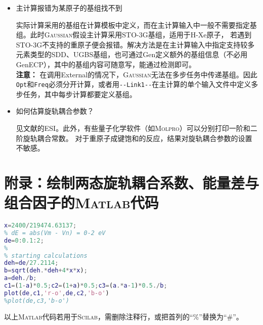 \documentclass[UTF8]{ctexart}
\begin{document}
\begin{itemize}
\item 主计算报错为某原子的基组找不到

  实际计算采用的基组在计算模板中定义，而在主计算输入中一般不需要指定基组。此时\textsc{Gaussian}假设主计算采用STO-3G基组，适用于H-Xe原子，
  若遇到STO-3G不支持的重原子便会报错。解决方法是在主计算输入中指定支持较多元素类型的\textsf{SDD}、\textsf{UGBS}基组，也可通过\textsf{Gen}定义额外的基组信息（不必用\textsf{GenECP}），其中的基组内容可随意写，能通过检测即可。\\
  \textbf{注意：} 在调用\textsf{External}的情况下，\textsc{Gaussian}无法在多步任务中传递基组。因此\verb|Opt|和\verb|Freq|必须分开计算，或者用\verb|--Link1--|在主计算的单个输入文件中定义多步任务，其中每步计算都要定义基组。

\item 如何估算旋轨耦合参数？

见文献\cite{ref3}的ESI。此外，有些量子化学软件（如\textsc{Molpro}）可以分别打印一阶和二阶旋轨耦合常数。
对于重原子成键饱和的反应，结果对旋轨耦合参数的设置不敏感。

\end{itemize}

\newpage

\appendix

\section{附录：绘制两态旋轨耦合系数、能量差与组合因子的\textsc{Matlab}代码}

\begin{lstlisting}[language=matlab]
% chi = 2400 cm-1
x=2400/219474.63137;
% dE = abs(Vm - Vn) = 0-2 eV
de=0:0.1:2;
%
% starting calculations
deh=de/27.2114;
b=sqrt(deh.*deh+4*x*x);
a=deh./b;
c1=(1-a)*0.5;c2=(1+a)*0.5;c3=(a.*a-1)*0.5./b;
plot(de,c1,'r-o',de,c2,'b-o')
%plot(de,c3,'b-o')
\end{lstlisting}

以上\textsc{Matlab}代码若用于\textsc{Scilab}，需删除注释行，或把首列的“\%”替换为“\#”。
\end{document}
